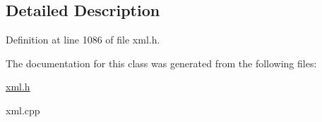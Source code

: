 \subsection{Detailed Description}


Definition at line 1086 of file xml.h.



The documentation for this class was generated from the following files:\begin{DoxyCompactItemize}
\item 
\hyperlink{xml_8h}{xml.h}\item 
xml.cpp\end{DoxyCompactItemize}
